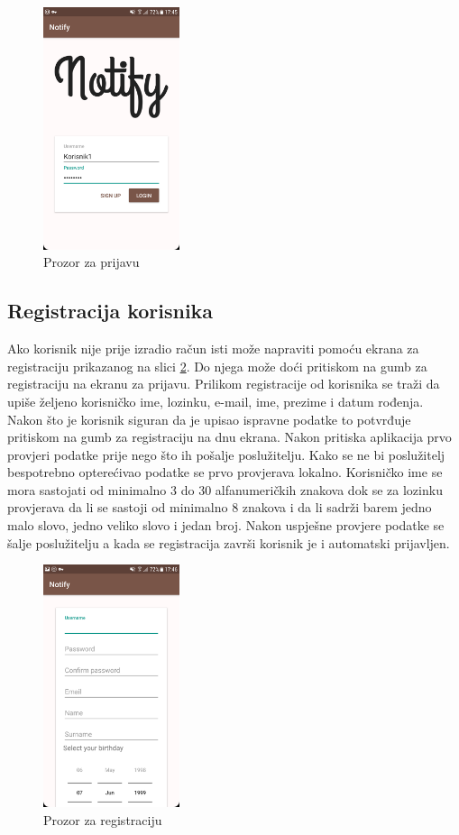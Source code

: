 \documentclass[times, utf8, zavrsni]{fer}
\begin{document}
{\begin{figure}[htb]
\centering
\includegraphics[width=4cm]{img/ss-login.png}
\caption{Prozor za prijavu}
\label{fig:login-image}
\end{figure}

\subsection{Registracija korisnika}
Ako korisnik nije prije izradio račun isti može napraviti pomoću ekrana za registraciju prikazanog na slici \ref{fig:register-image}. Do njega može doći pritiskom na gumb za registraciju  na ekranu za prijavu. Prilikom registracije od korisnika se traži da upiše željeno korisničko ime, lozinku, e-mail, ime, prezime i datum rođenja. Nakon što je korisnik siguran da je upisao ispravne podatke to potvrđuje pritiskom na gumb za registraciju na dnu ekrana. Nakon pritiska aplikacija prvo provjeri podatke prije nego što ih pošalje poslužitelju. Kako se ne bi poslužitelj bespotrebno opterećivao podatke se prvo provjerava lokalno. Korisničko ime se mora sastojati od minimalno 3 do 30 alfanumeričkih znakova dok se za lozinku provjerava da li se sastoji od minimalno 8 znakova i da li sadrži barem jedno malo slovo, jedno veliko slovo i jedan broj. Nakon uspješne provjere podatke se šalje poslužitelju a kada se registracija završi korisnik je i automatski prijavljen.

\begin{figure}[htb]
\centering
\includegraphics[width=4cm]{img/ss-register.png}
\caption{Prozor za registraciju}
\label{fig:register-image}
\end{figure}

}
\end{document}
